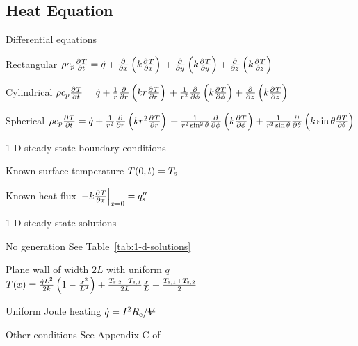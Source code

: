\documentclass{article}
\begin{document}
\begin{multicols}{2}
\section{Heat Equation}
\begin{description*}
\item[Differential equations]~
  \begin{description*}
  \item[Rectangular]
    \(\rho c_p \pd{T}{t}
    = \dot q
    + \pd{}{x}\left(k\pd{T}{x}\right) \\
    + \pd{}{y}\left(k\pd{T}{y}\right)
    + \pd{}{z}\left(k\pd{T}{z}\right)\)
  \item[Cylindrical]
    \(\rho c_p \pd{T}{t}
    = \dot q
    + \frac{1}{r}\pd{}{r}\left(kr\pd{T}{r}\right) \\
    + \frac{1}{r^2}\pd{}{\phi}\left(k\pd{T}{\phi}\right)
    + \pd{}{z}\left(k\pd{T}{z}\right)\)
  \item[Spherical]
    \(\rho c_p \pd{T}{t}
    = \dot q
    + \frac{1}{r^2}\pd{}{r}\left(kr^2\pd{T}{r}\right) \\
    + \frac{1}{r^2\sin^2\theta}\pd{}{\phi}\left(k\pd{T}{\phi}\right)
    + \frac{1}{r^2\sin\theta}\pd{}{\theta}\left(k\sin\theta\pd{T}{\theta}\right)\)
  \end{description*}
\item[1-D steady-state boundary conditions]~
  \begin{description*}
  \item[Known surface temperature]
    \(T(0,t) = T_{\mathrm{s}}\)
  \item[Known heat flux]
    \(\left.-k\pd{T}{x}\right|_{x=0} = q''_\mrm{s}\)
  \end{description*}
\item[1-D steady-state solutions]~
  \begin{description*}
  \item[No generation] See Table~\ref{tab:1-d-solutions}
  \item[Plane wall of width $2L$ with uniform $\dot q$]
    \(T(x) \\
    = \frac{\dot{q}L^2}{2k}\left(1-\frac{x^2}{L^2}\right)
    + \frac{T_{\mathrm{s,2}}-T_{\mathrm{s,1}}}{2L}\frac{x}{L}
    + \frac{T_{\mathrm{s,1}}+T_{\mathrm{s,2}}}{2}\)
  \item[Uniform Joule heating]
    \(\dot q = I^2R_\mrm{e}/\volsym\)
  \item[Other conditions] See Appendix C of~\cite{hamt}
  \end{description*}
\end{description*}


\end{multicols}
\end{document}
